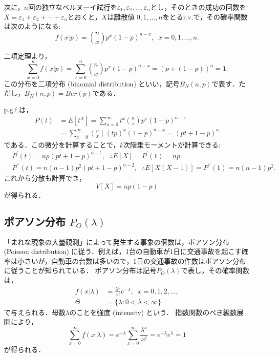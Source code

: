 \documentclass{jsreport}
\begin{document}
次に，$n$回の独立なベルヌーイ試行を$\varepsilon_1, \varepsilon_2, \ldots, \varepsilon_n$とし，そのときの成功の回数を$X = \varepsilon_1 + \varepsilon_2 + \cdots + \varepsilon_n$とおくと，$X$は離散値
$0, 1, \ldots, n$をとるr.v.で，その確率関数は次のようになる:
\begin{equation}
  f(x|p) = \binom{n}{x} p^x (1 - p)^{n - x}, \; \; x = 0, 1, \ldots, n. \nonumber
\end{equation}

二項定理より，
\begin{equation}
  \sum_{x = 0}^n f(x|p) = \sum_{x = 0}^n \binom{n}{x} p^x (1 - p)^{n - x} = (p + (1 - p))^n = 1. \nonumber
\end{equation}
この分布を二項分布 (binomial distribution) といい，記号$B_N(n, p)$で表す．ただし，$B_N(n, p) = Ber(p)$である．

p.g.f.は，
\begin{align}
  P(t) &= E[t^X] = \sum_{x = 0}^{\infty} t^x \binom{n}{x} p^x (1 - p)^{n - x} \nonumber \\
  &= \sum_{x = 0}^{\infty} \binom{n}{x} (tp)^x (1 - p)^{n - x} = (pt + 1 - p)^n \nonumber
\end{align}
である．この微分を計算することで，$k$次階乗モーメントが計算できる:
\begin{align}
  &P^{\prime}(t) = np(pt + 1 - p)^{n - 1}, \; \; \therefore E[X] = P^{\prime}(1) = np. \nonumber \\
  &P^{\prime \prime}(t) = n(n - 1)p^2(pt + 1 - p)^{n - 2}, \; \; \therefore E[X(X - 1)] = P^{\prime \prime}(1) = n(n - 1)p^2. \nonumber
\end{align}
これから分散も計算でき，
\begin{equation}
  V[X] = np(1 - p) \nonumber
\end{equation}
が得られる．

\subsection{ポアソン分布 $P_O(\lambda)$}
「まれな現象の大量観測」によって発生する事象の個数は，ポアソン分布 (Poisson distribution) に従う．例えば，1台の自動車が1日に交通事故を起こす確率は小さいが，自動車の台数は多いので，1日の交通事故の件数はポアソン分布に従うことが知られている．
ポアソン分布は記号$P_O(\lambda)$で表し，その確率関数は，
\begin{align}
  f(x | \lambda) &= \frac{\lambda^x}{x!} e^{-\lambda}, \; \; x = 0, 1, 2, \ldots, \nonumber \\
  \Theta &= \{\lambda : 0 < \lambda < \infty\} \nonumber
\end{align}
で与えられる．母数$\lambda$のことを強度 (intensity) という．
指数関数のべき級数展開により，
\begin{equation}
  \sum_{x = 0}^{\infty} f(x | \lambda) = e^{-\lambda} \sum_{x = 0}^{\infty} \frac{\lambda^x}{x!} = e^{-\lambda}e^{\lambda} = 1 \nonumber
\end{equation}
が得られる．
\end{document}
